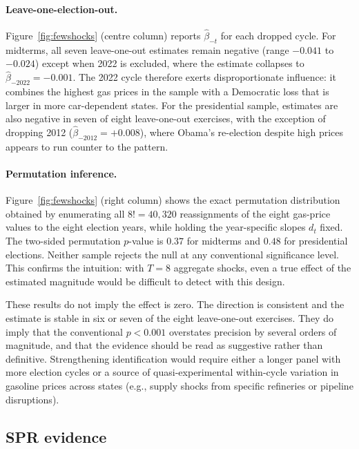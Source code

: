 \documentclass[12pt]{article}
\begin{document}
\paragraph{Leave-one-election-out.}
Figure~\ref{fig:fewshocks} (centre column) reports $\hat\beta_{-t}$ for each dropped cycle. For midterms, all seven leave-one-out estimates remain negative (range $-0.041$ to $-0.024$) except when 2022 is excluded, where the estimate collapses to $\hat\beta_{-2022}=-0.001$. The 2022 cycle therefore exerts disproportionate influence: it combines the highest gas prices in the sample with a Democratic loss that is larger in more car-dependent states. For the presidential sample, estimates are also negative in seven of eight leave-one-out exercises, with the exception of dropping 2012 ($\hat\beta_{-2012}=+0.008$), where Obama's re-election despite high prices appears to run counter to the pattern.

\paragraph{Permutation inference.}
Figure~\ref{fig:fewshocks} (right column) shows the exact permutation distribution obtained by enumerating all $8!=40{,}320$ reassignments of the eight gas-price values to the eight election years, while holding the year-specific slopes $d_t$ fixed. The two-sided permutation $p$-value is $0.37$ for midterms and $0.48$ for presidential elections. Neither sample rejects the null at any conventional significance level. This confirms the intuition: with $T=8$ aggregate shocks, even a true effect of the estimated magnitude would be difficult to detect with this design.

These results do not imply the effect is zero. The direction is consistent and the estimate is stable in six or seven of the eight leave-one-out exercises. They do imply that the conventional $p<0.001$ overstates precision by several orders of magnitude, and that the evidence should be read as suggestive rather than definitive. Strengthening identification would require either a longer panel with more election cycles or a source of quasi-experimental within-cycle variation in gasoline prices across states (e.g., supply shocks from specific refineries or pipeline disruptions).

\subsection{SPR evidence}
\end{document}
